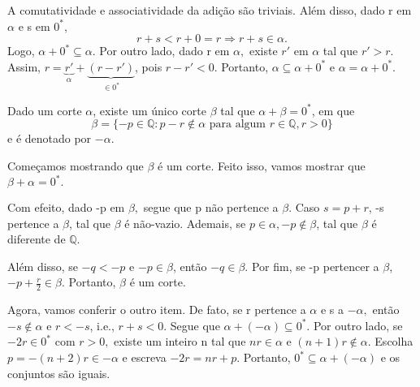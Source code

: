 \documentclass[Analysis/analysis_notes.tex]{subfiles}
\begin{document}
A comutatividade e associatividade da adi\c c\~ao s\~ao triviais. Al\'em disso, dado r em $\alpha$ e s em $0^*,$
$$
	r + s < r + 0 = r\Rightarrow r + s \in \alpha.
$$
Logo, $\alpha + 0^* \subseteq{\alpha}$. Por outro lado, dado r em $\alpha,$ existe $r'\text{ em } \alpha$ tal que $r' > r.$
Assim, $r = \underbrace{r'}_{\alpha} + \underbrace{(r - r')}_{\in 0^*}$, pois $r - r' < 0.$ Portanto, $\alpha \subseteq{\alpha + 0^*}$ e
$\alpha = \alpha + 0^*.$
\begin{prop*}
	Dado um corte $\alpha$, existe um \'unico corte $\beta$ tal que $\alpha + \beta = 0^*$, em que
	$$
		\beta = \{-p\in \mathbb{Q}: p - r\not\in \alpha \text{ para algum } r\in \mathbb{Q}, r > 0\}
	$$
	e \'e denotado por $-\alpha$.
\end{prop*}
\begin{proof*}
	Come\c camos mostrando que $\beta$ \'e um corte. Feito isso, vamos mostrar que $\beta + \alpha = 0^*.$

	Com efeito, dado -p em $\beta,$ segue que p n\~ao pertence a $\beta$. Caso $s = p + r$, -s pertence a $\beta$, tal que
	$\beta$ \'e n\~ao-vazio. Ademais, se $p\in \alpha, -p\not\in \beta$, tal que $\beta$ \'e diferente de $\mathbb{Q}.$

	Al\'em disso, se $-q < -p$ e $-p\in \beta$, ent\~ao $-q \in \beta$. Por fim, se -p pertencer a $\beta$, $\displaystyle -p + \frac{r}{2}\in \beta$.
	Portanto, $\beta$ \'e um corte.

	Agora, vamos conferir o outro item. De fato, se r pertence a $\alpha$ e s a $-\alpha,$ ent\~ao $-s\not\in \alpha$ e $r < -s$, i.e.,
	$r + s < 0.$ Segue que $\alpha + (-\alpha) \subseteq{0^*}.$ Por outro lado, se $-2r\in 0^*$ com $r > 0,$ existe um inteiro n tal que
	$nr\in \alpha$ e $(n+1)r\not\in \alpha$. Escolha $p = -(n+2)r\in -\alpha$ e escreva $-2r = nr + p.$ Portanto, $0^*\subseteq{\alpha + (-\alpha)}$ e os
	conjuntos s\~ao iguais. \qedsymbol
\end{proof*}
\end{document}
